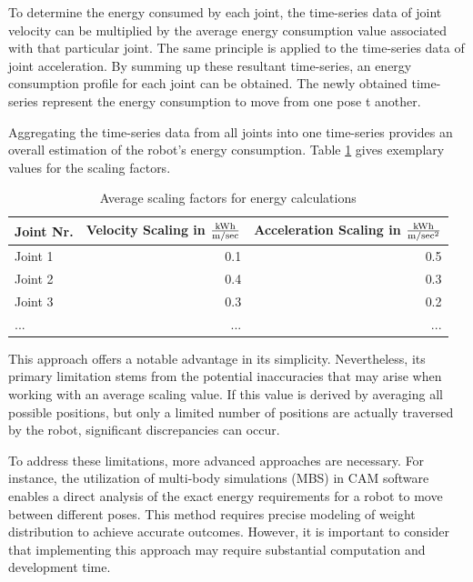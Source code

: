 To determine the energy consumed by each joint, the time-series data of joint velocity can be multiplied by the average energy consumption value associated with that particular joint. The same principle is applied to the time-series data of joint acceleration. By summing up these resultant time-series, an energy consumption profile for each joint can be obtained. The newly obtained time-series represent the energy consumption to move from one pose t another.

Aggregating the time-series data from all joints into one time-series provides an overall estimation of the robot's energy consumption. Table \ref{scalers} gives exemplary values for the scaling factors.\newline


\begin{table}[H]
	\centering
	\begin{tabular}{||l|r|r||}
		Joint Nr.  & Velocity Scaling in \(\frac{\si[per-mode=symbol]{\kWh}}{\si[per-mode=symbol]{\m\per\sec }}\)& Acceleration Scaling in \(\frac{\si[per-mode=symbol]{\kWh}}{\si[per-mode=symbol]{\m\per\sec\squared }}\) \\
		\hline
		\hline
		\hline
		Joint 1	& 0.1 & 0.5\\
		Joint 2	&  0.4& 0.3 \\
		Joint 3	& 0.3& 0.2\\
		...& ...& ...\\
		
		\hline
		\hline
	\end{tabular}
	
	\caption{Average scaling factors for energy calculations}
	\label{scalers}
\end{table}


This approach offers a notable advantage in its simplicity. Nevertheless, its primary limitation stems from the potential inaccuracies that may arise when working with an average scaling value. If this value is derived by averaging all possible positions, but only a limited number of positions are actually traversed by the robot, significant discrepancies can occur.


To address these limitations, more advanced approaches are necessary. For instance, the utilization of multi-body simulations (MBS) in CAM software enables a direct analysis of the exact energy requirements for a robot to move between different poses. This method requires precise modeling of weight distribution to achieve accurate outcomes. However, it is important to consider that implementing this approach may require substantial computation and development time.


